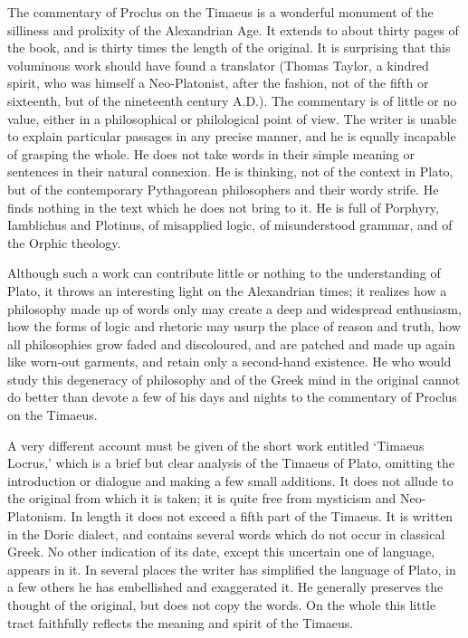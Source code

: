 \documentclass[11pt,letter]{article}
\begin{document}
\par  The commentary of Proclus on the Timaeus is a wonderful monument of the silliness and prolixity of the Alexandrian Age. It extends to about thirty pages of the book, and is thirty times the length of the original. It is surprising that this voluminous work should have found a translator (Thomas Taylor, a kindred spirit, who was himself a Neo-Platonist, after the fashion, not of the fifth or sixteenth, but of the nineteenth century A.D.). The commentary is of little or no value, either in a philosophical or philological point of view. The writer is unable to explain particular passages in any precise manner, and he is equally incapable of grasping the whole. He does not take words in their simple meaning or sentences in their natural connexion. He is thinking, not of the context in Plato, but of the contemporary Pythagorean philosophers and their wordy strife. He finds nothing in the text which he does not bring to it. He is full of Porphyry, Iamblichus and Plotinus, of misapplied logic, of misunderstood grammar, and of the Orphic theology.

\par  Although such a work can contribute little or nothing to the understanding of Plato, it throws an interesting light on the Alexandrian times; it realizes how a philosophy made up of words only may create a deep and widespread enthusiasm, how the forms of logic and rhetoric may usurp the place of reason and truth, how all philosophies grow faded and discoloured, and are patched and made up again like worn-out garments, and retain only a second-hand existence. He who would study this degeneracy of philosophy and of the Greek mind in the original cannot do better than devote a few of his days and nights to the commentary of Proclus on the Timaeus.

\par  A very different account must be given of the short work entitled ‘Timaeus Locrus,’ which is a brief but clear analysis of the Timaeus of Plato, omitting the introduction or dialogue and making a few small additions. It does not allude to the original from which it is taken; it is quite free from mysticism and Neo-Platonism. In length it does not exceed a fifth part of the Timaeus. It is written in the Doric dialect, and contains several words which do not occur in classical Greek. No other indication of its date, except this uncertain one of language, appears in it. In several places the writer has simplified the language of Plato, in a few others he has embellished and exaggerated it. He generally preserves the thought of the original, but does not copy the words. On the whole this little tract faithfully reflects the meaning and spirit of the Timaeus.
\end{document}
